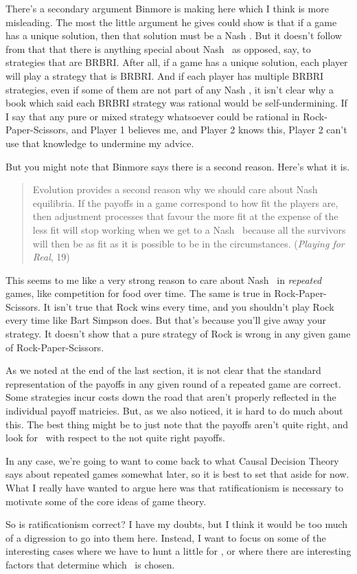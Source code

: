There's a secondary argument Binmore is making here which I think is more misleading. The most the little argument he gives could show is that if a game has a unique solution, then that solution must be a Nash \eqm. But it doesn't follow from that that there is anything special about Nash \eqm\ as opposed, say, to strategies that are BRBRI. After all, if a game has a unique solution, each player will play a strategy that is BRBRI. And if each player has multiple BRBRI strategies, even if some of them are not part of any Nash \eqm, it isn't clear why a book which said each BRBRI strategy was rational would be self-undermining. If I say that any pure or mixed strategy whatsoever could be rational in Rock-Paper-Scissors, and Player 1 believes me, and Player 2 knows this, Player 2 can't use that knowledge to undermine my advice.

But you might note that Binmore says there is a second reason. Here's what it is.

\begin{quote}
Evolution provides a second reason why we should care about Nash equilibria. If the payoffs in a game correspond to how fit the players are, then adjustment processes that favour the more fit at the expense of the less fit will stop working when we get to a Nash \eqm\ because all the survivors will then be as fit as it is possible to be in the circumstances. (\textit{Playing for Real}, 19)
\end{quote}

\noindent This seems to me like a very strong reason to care about Nash \eqm\ in \textit{repeated} games, like competition for food over time. The same is true in Rock-Paper-Scissors. It isn't true that Rock wins every time, and you shouldn't play Rock every time like Bart Simpson does. But that's because you'll give away your strategy. It doesn't show that a pure strategy of Rock is wrong in any given game of Rock-Paper-Scissors.

As we noted at the end of the last section, it is not clear that the standard representation of the payoffs in any given round of a repeated game are correct. Some strategies incur costs down the road that aren't properly reflected in the individual payoff matricies. But, as we also noticed, it is hard to do much about this. The best thing might be to just note that the payoffs aren't quite right, and look for \eqm\ with respect to the not quite right payoffs.

In any case, we're going to want to come back to what Causal Decision Theory says about repeated games somewhat later, so it is best to set that aside for now. What I really have wanted to argue here was that ratificationism is necessary to motivate some of the core ideas of game theory.

So is ratificationism correct? I have my doubts, but I think it would be too much of a digression to go into them here. Instead, I want to focus on some of the interesting cases where we have to hunt a little for \eqm, or where there are interesting factors that determine which \eqm\ is chosen.